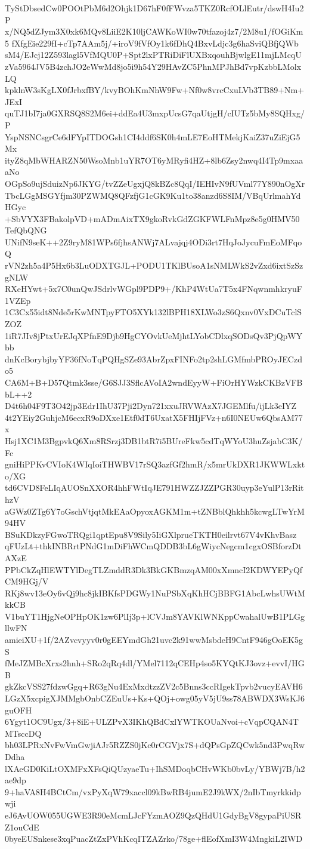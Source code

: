 TyStDbsedCw0POOtPbM6d2Ohjk1D67hF0fFWvza5TKZ0RcfOLlEutr/dswH4Iu2P
x/NQ5dZJym3X0xk6MQv8LiiE2K10ljCAWKoWI0w70tfazoj4z7/2M8u1/fOGiKm5
fXfgEie229fI+cTp7AAm5j/+iroV9fVfOy1k6fDhQ4BxvLdjc3g6haSviQBfjQWb
sM4/EJcj12Z593lagl5VfMQU0P+Spt2lxPTRiDiFlUXBxqouhBjwlgE11mjLMcqU
zVa5964JV5B4zchJO2eWwMd8jo5i9h54Y29HAvZC5PhnMPJhBd7vpKzbbLMolxLQ
kpklnW3sKgLX0fJrbxfBY/kvyBOhKmNhW9Fw+Nf0w8vrcCxuLVb3TB89+Nm+JExI
quTJ1bI7ja0GXRSQ8S2M6ei+ddEa4U3mxpUcsG7qaUtjgH/cIUTz5bMy8SQHxg/P
YspNSNCsgrCe6dFYpITDOGsh1CI4ddf6SK0h4mLE7EoHTMekjKaiZ37uZiEjG5Mx
ityZ8qMbWHARZN50WsoMnb1uYR7OT6yMRyfi4HZ+8lb6Zsy2nwq4I4Tp9mxaaaNo
OGpSo9ujSduizNp6JKYG/tvZZeUgxjQ8kBZc8QqI/IEHIvN9fUVml77Y890nOgXr
TbcLGgMSGYfjm30PZWMQ8QFzfjG1cGK9Ku1to38anzd6S8IM/VBqUrlmahYdHGyc
+SbVYX3FBakolpVD+mADmAixTX9gkoRvkGdZGKFWLFnMpz8e5g0HMV50TefQbQNG
UNifN9seK++2Z9ryM81WPs6fjhsANWj7ALvajqj4ODi3rt7HqJoJycuFmEoMFqoQ
rVN2zh5a4P5Hx6b3LuODXTGJL+PODU1TKlBUsoA1sNMLWkS2vZxd6ixtSzSzgNLW
RXeHYwt+5x7C0unQwJSdrlvWGpl9PDP9+/KhP4WtUa7T5x4FNqwnmhkryuF1VZEp
1C3Cx55idt8Nde5rKwMNTpyFTO5XYk132lBPH18XLWo3zS6Qxnv0VxDCuTclSZOZ
1iR7JIv8jPtxUrEJqXPfnE9Djb9HgCYOvkUeMjhtLYobCDlxqSODsQv3PjQpWYbb
dnKcBorybjbyYF36fNoTqPQHgSZe93AbrZpxFINFo2tp2shLGMfmbPROyJECzdo5
CA6M+B+D57Qtmk3sse/G6SJJ3SflcAVoIA2wndEyyW+FiOrHYWzkCKBzVFBbL++2
D4t6h04F9T3O42jp3Edr1IhU37Pji2Dyn721xxuJRVWAzX7JGEMlfu/ijLk3eIYZ
4t2YEiy2GuhjcM6ecxR9oDXxe1Etf0dT6UxatX5FHIjFVz+n6I0NEUw6QbsAM77x
Hsj1XC1M3BgpvkQ6Xm8RSrzj3DB1btR7i5BUreFkw5cdTqWYoU3huZsjabC3K/Fc
gniHiPPKvCVIoK4WIqIoiTHWBV17rSQ3azfGf2hmR/x5mrUkDXR1JKWWLxkto/XG
td6CVD8FeLIqAUOSnXXOR4hhFWtIqJE791HWZZJZZPGR30uyp3eYulP13rRithzV
aGWz0ZTg6Y7oGschVtjqtMkEAaOpyoxAGKM1m+tZNBblQhkhh5kcwgLTwYrM94HV
BSuKDkzyFGwoTRQgi1qptEpu8V9Sily5IiGXlprueTKTH0eilrvt67V4vKhvBasz
qFUzLt+thkINBRrtPNdG1mDiFhWCmQDDB3bL6gWiycNegcm1cgxOSBforzDtAXzE
PPbCkZqHlEWTYlDegTLZmddR3Dk3BkGKBmzqAM00xXmncI2KDWYEPyQfCM9HGj/V
RKj8wv13eOy6vQj9hc8jkIBKfsPDGWy1NuPSbXqKhHCjBBFG1AbcLwhsUWtMkkCB
V1buYT1HjgNeOPHpOK1zw6PlIj3p+lCVJm8YAVKlWNKppCwahalUwB1PLGgllwFN
amieiXU+1f/2AZvcvyyv0r0gEEYmdGh21uvc2k91wwMsbdeH9CntF946gOoEK5gS
fMeJZMBcXrxs2hnh+SRo2qRq4dl/YMel7112qCEHp4so5KYQtKJ3ovz+evvI/HGB
gkZkcVSS27fdzwGgq+R63gNu4ExMxdtzzZV2c5Bnns3ccRIgekTpvb2vucyEAVH6
LGzX5xcpigXJMMgbOnbCZEuUs+Ks+QOj+owg05yV5jU9ss78ABWDX3WsKJ6guOFH
6Ygyt1OC9Ugx/3+8iE+ULZPvX3IKhQBdCxlYWTKOUaNvoi+cVqpCQAN4TMTsccDQ
bh03LPRxNvFwVmGwjiAJr5RZZS0jKc0rCGVjx7S+dQPsGpZQCwk5nd3PwqRwDdha
lXAeGD0KiLtOXMFxXFsQiQUzyaeTu+IhSMDoqbCHvWKb0bvLy/YBWj7B/h2ae9dp
9+haVA8H4BCtCm/vxPyXqW79xaccl09kBwRB4jumE2J9kWX/2nIbTmyrkkidpwji
eJ6AvUOW055UGWE3R90eMcmLJcFYzmAOZ9QzQHdU1GdyBgV8gypaPiUSRZ1ouCdE
0byeEUSnkese3xqPuacZtZxPVhKcqITZAZrko/78ge+flEofXmI3W4MngkiL2IWD
